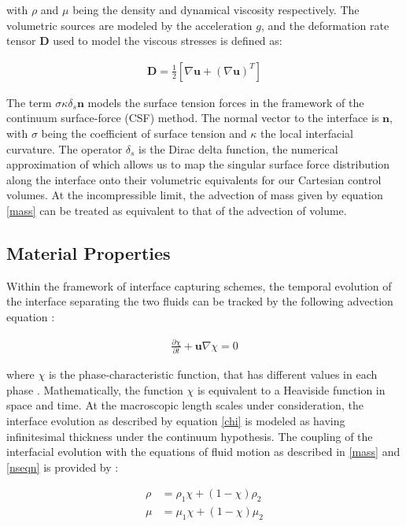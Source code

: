 with $\rho$ and $\mu$ being the density and dynamical viscosity respectively. 
The volumetric sources are modeled by the acceleration $g$, and the 
deformation rate tensor $\boldsymbol{D}$ used to model the viscous stresses is defined as:  

\begin{align}
	\boldsymbol{D} = \frac{1}{2}\left[\nabla \boldsymbol{u} + \left(\nabla \boldsymbol{u}\right)^{T}\right]  
\end{align}


The term $\sigma \kappa \delta_{s}\boldsymbol{n}$ models the surface tension forces in the 
framework of the continuum surface-force (CSF) method. The normal vector to the interface 
is $\boldsymbol{n}$, with $\sigma$ being the coefficient of surface tension and $\kappa$ the 
local interfacial curvature. The operator $\delta_{s}$ is the Dirac delta function, 
the numerical approximation of which allows us to map the singular surface force distribution
along the interface onto their volumetric equivalents for our Cartesian control volumes. 
At the incompressible limit, the advection of mass given by equation \ref{mass} can be 
treated as equivalent to that of the advection of volume.

\subsection*{Material Properties}

Within the framework of interface capturing schemes, the 
temporal evolution of the interface separating the two fluids
can be tracked by the following advection equation : 

\begin{align} 
	\frac{\partial \chi}{\partial t} + \boldsymbol{u}\nabla\chi = 0 	
\label{chi}
\end{align}

where $\chi$ is the phase-characteristic function, that has different values 
in each phase  . Mathematically, the function $\chi$
is equivalent to a Heaviside function in space and time. 
At the macroscopic length scales under consideration, the interface evolution
as described by equation \ref{chi} is modeled as having infinitesimal thickness
under the continuum hypothesis. The coupling of the interfacial evolution with
the equations of fluid motion as described in \ref{mass} and \ref{nseqn} is provided by :  

\begin{align}
	\rho &= \rho_{1}\chi + \left(1 - \chi\right)\rho_{2} \label {rho_chi} \\ 
	\mu  &= \mu_{1}\chi  + \left(1 - \chi\right)\mu_{2}  
  \label{mu_chi}
\end{align}

